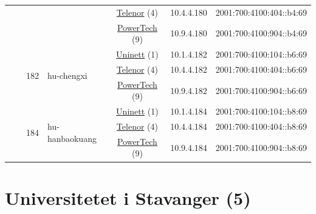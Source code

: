 \begin{small}
\begin{center}
\begin{longtable}{|c|c|c|c|c|c|c|c|}
  &  &  &  & \multicolumn{2}{|c|}{\tiny{\href{https://www.telenor.no}{Telenor} (4)}} & \tiny{10.4.4.180} & \tiny{2001:700:4100:404::b4:69} \\* \cline{5-5}\cline{6-6}\cline{7-7}\cline{8-8}
  &  &  &  & \multicolumn{2}{|c|}{\tiny{\href{http://www.powertech.no}{PowerTech} (9)}} & \tiny{10.9.4.180} & \tiny{2001:700:4100:904::b4:69} \\* \cline{3-3}\cline{4-4}\cline{5-5}\cline{6-6}\cline{7-7}\cline{8-8}
  &  & \multirow{3}{*}{\tiny{182}} & \multicolumn{1}{|l|}{\multirow{3}{*}{\tiny{hu-chengxi}}} & \multicolumn{2}{|c|}{\tiny{\href{https://www.uninett.no}{Uninett} (1)}} & \tiny{10.1.4.182} & \tiny{2001:700:4100:104::b6:69} \\* \cline{5-5}\cline{6-6}\cline{7-7}\cline{8-8}
  &  &  &  & \multicolumn{2}{|c|}{\tiny{\href{https://www.telenor.no}{Telenor} (4)}} & \tiny{10.4.4.182} & \tiny{2001:700:4100:404::b6:69} \\* \cline{5-5}\cline{6-6}\cline{7-7}\cline{8-8}
  &  &  &  & \multicolumn{2}{|c|}{\tiny{\href{http://www.powertech.no}{PowerTech} (9)}} & \tiny{10.9.4.182} & \tiny{2001:700:4100:904::b6:69} \\* \cline{3-3}\cline{4-4}\cline{5-5}\cline{6-6}\cline{7-7}\cline{8-8}
  &  & \multirow{3}{*}{\tiny{184}} & \multicolumn{1}{|l|}{\multirow{3}{*}{\tiny{hu-hanbaokuang}}} & \multicolumn{2}{|c|}{\tiny{\href{https://www.uninett.no}{Uninett} (1)}} & \tiny{10.1.4.184} & \tiny{2001:700:4100:104::b8:69} \\* \cline{5-5}\cline{6-6}\cline{7-7}\cline{8-8}
  &  &  &  & \multicolumn{2}{|c|}{\tiny{\href{https://www.telenor.no}{Telenor} (4)}} & \tiny{10.4.4.184} & \tiny{2001:700:4100:404::b8:69} \\* \cline{5-5}\cline{6-6}\cline{7-7}\cline{8-8}
  &  &  &  & \multicolumn{2}{|c|}{\tiny{\href{http://www.powertech.no}{PowerTech} (9)}} & \tiny{10.9.4.184} & \tiny{2001:700:4100:904::b8:69} \\ \hline
\end{longtable}
\end{center}
\end{small}



\section{Universitetet i Stavanger (5)}
\label{sec:UiS}

